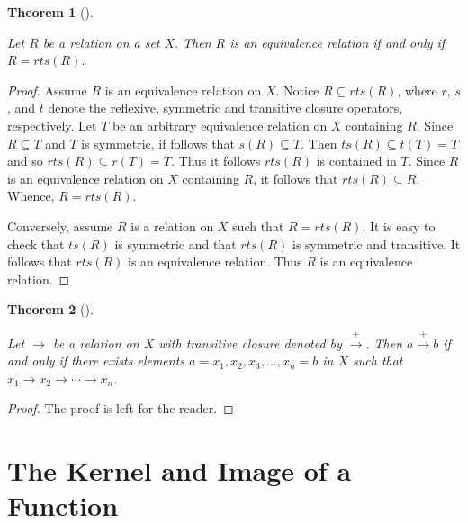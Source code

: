 \documentclass[
  letterpaper,
  10pt,
  reqno,
  twopage,
  openany]{book}
\theoremstyle{plain}
\theoremstyle{definition}
\theoremstyle{definition}
\theoremstyle{definition}
\theoremstyle{plain}
\theoremstyle{plain}
\newtheorem{theorem}{Theorem}[chapter]
\theoremstyle{remark}
\begin{document}
\leavevmode{}%
\begin{theorem}[]\label{thm-equivalence-relation-rts}

Let \(R\) be a relation on a set \(X.\) Then \(R\) is an equivalence
relation if and only if \(R=rts(R).\)

\end{theorem}

\begin{proof}

Assume \(R\) is an equivalence relation on \(X.\) Notice
\(R\subseteq rts(R)\), where \(r\), \(s\), and \(t\) denote the
reflexive, symmetric and transitive closure operators, respectively. Let
\(T\) be an arbitrary equivalence relation on \(X\) containing \(R\).
Since \(R\subseteq T\) and \(T\) is symmetric, if follows that
\(s(R)\subseteq T\). Then \(ts(R)\subseteq t(T)=T\) and so
\(rts(R)\subseteq r(T)=T\). Thus it follows \(rts(R)\) is contained in
\(T\). Since \(R\) is an equivalence relation on \(X\) containing \(R\),
it follows that \(rts(R)\subseteq R.\) Whence, \(R=rts(R).\)

Conversely, assume \(R\) is a relation on \(X\) such that \(R=rts(R).\)
It is easy to check that \(ts(R)\) is symmetric and that \(rts(R)\) is
symmetric and transitive. It follows that \(rts(R)\) is an equivalence
relation. Thus \(R\) is an equivalence relation.

\end{proof}

\leavevmode{}%
\begin{theorem}[]\label{thm-transitive-closure-path}

Let \(\longrightarrow\) be a relation on \(X\) with transitive closure
denoted by \(\stackrel{+}{\longrightarrow}.\) Then
\(a\stackrel{+}{\longrightarrow} b\) if and only if there exists
elements \(a=x_1, x_2, x_3, ..., x_n=b\) in \(X\) such that
\(x_1\longrightarrow x_2 \longrightarrow \cdots \longrightarrow x_n.\)

\end{theorem}

\begin{proof}

The proof is left for the reader.

\end{proof}

\hypertarget{the-kernel-and-image-of-a-function}{%
\section{The Kernel and Image of a
Function}\label{the-kernel-and-image-of-a-function}}
\end{document}
